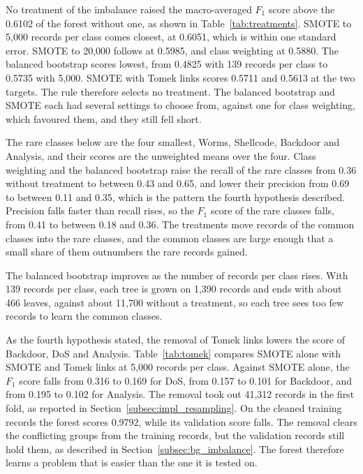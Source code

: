 \documentclass[conference,10pt]{IEEEtran}
\begin{document}
No treatment of the imbalance raised the macro-averaged $F_1$ score above
the 0.6102 of the forest without one, as shown in Table~\ref{tab:treatments}.
SMOTE to 5,000 records per class comes closest, at 0.6051, which is within one
standard error. SMOTE to 20,000 follows at 0.5985, and class weighting at
0.5880. The balanced bootstrap scores lowest, from 0.4825 with 139 records
per class to 0.5735 with 5,000. SMOTE with Tomek links scores 0.5711 and
0.5613 at the two targets. The rule therefore selects no treatment. The
balanced bootstrap and SMOTE each had several settings to choose from,
against one for class weighting, which favoured them, and they still fell
short.

The rare classes below are the four smallest, Worms, Shellcode, Backdoor
and Analysis, and their scores are the unweighted means over the four.
Class weighting and the balanced bootstrap raise the recall of the rare
classes from 0.36 without treatment to between 0.43 and 0.65, and lower
their precision from 0.69 to between 0.11 and 0.35, which is the
pattern the fourth hypothesis described. Precision falls faster than
recall rises, so the $F_1$ score of the rare classes falls, from 0.41 to
between 0.18 and 0.36. The treatments move records of the common classes
into the rare classes, and the common classes are large enough that a small
share of them outnumbers the rare records gained.

The balanced bootstrap improves as the number of records per class rises.
With 139 records per class, each tree is grown on 1,390 records and ends
with about 466 leaves, against about 11,700 without a treatment, so each tree sees too few records
to learn the common classes.

As the fourth hypothesis stated, the removal of Tomek links lowers the score
of Backdoor, DoS and Analysis. Table~\ref{tab:tomek} compares SMOTE alone with SMOTE and Tomek links at 5,000 records per class. Against SMOTE alone, the $F_1$ score falls from 0.316 to 0.169 for DoS, from 0.157 to
0.101 for Backdoor, and from 0.195 to 0.102 for Analysis. The removal took out 41,312 records in the first fold, as reported in Section~\ref{subsec:impl_resampling}. On the cleaned training records the
forest scores 0.9792, while its validation score falls. The removal clears
the conflicting groups from the training records, but the validation
records still hold them, as described in Section~\ref{subsec:bg_imbalance}. The forest therefore learns a problem that is easier than the one it is tested on.
\end{document}
